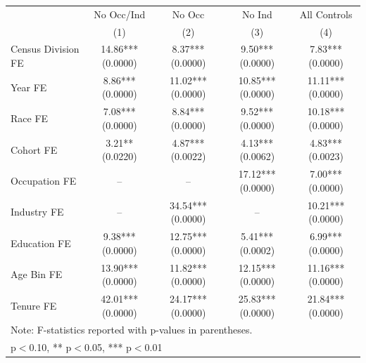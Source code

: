 \begin{tabular}{lcccc}
\hline\hline
 & No Occ/Ind & No Occ & No Ind & All Controls \\
 & (1) & (2) & (3) & (4) \\
\hline
Census Division FE&14.86*** (0.0000)&8.37*** (0.0000)&9.50*** (0.0000)&7.83*** (0.0000)\\
Year FE&8.86*** (0.0000)&11.02*** (0.0000)&10.85*** (0.0000)&11.11*** (0.0000)\\
Race FE&7.08*** (0.0000)&8.84*** (0.0000)&9.52*** (0.0000)&10.18*** (0.0000)\\
Cohort FE&3.21** (0.0220)&4.87*** (0.0022)&4.13*** (0.0062)&4.83*** (0.0023)\\
Occupation FE&--&--&17.12*** (0.0000)&7.00*** (0.0000)\\
Industry FE&--&34.54*** (0.0000)&--&10.21*** (0.0000)\\
Education FE&9.38*** (0.0000)&12.75*** (0.0000)&5.41*** (0.0002)&6.99*** (0.0000)\\
Age Bin FE&13.90*** (0.0000)&11.82*** (0.0000)&12.15*** (0.0000)&11.16*** (0.0000)\\
Tenure FE&42.01*** (0.0000)&24.17*** (0.0000)&25.83*** (0.0000)&21.84*** (0.0000)\\
\hline
\multicolumn{5}{l}{\footnotesize Note: F-statistics reported with p-values in parentheses.} \\
\multicolumn{5}{l}{\footnotesize * p$<$0.10, ** p$<$0.05, *** p$<$0.01} \\
\hline\hline
\end{tabular}
